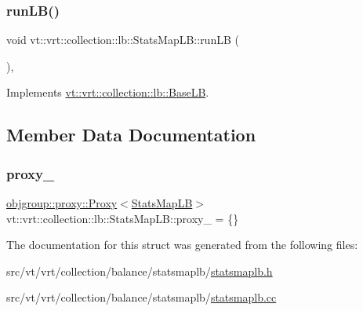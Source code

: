 \mbox{\label{structvt_1_1vrt_1_1collection_1_1lb_1_1_stats_map_l_b_a20a7bd354dcaca4393c66034be3b4083}} 
\subsubsection{\texorpdfstring{run\+L\+B()}{runLB()}}
{\footnotesize\ttfamily void vt\+::vrt\+::collection\+::lb\+::\+Stats\+Map\+L\+B\+::run\+LB (\begin{DoxyParamCaption}{ }\end{DoxyParamCaption})\hspace{0.3cm}{\ttfamily [override]}, {\ttfamily [virtual]}}



Implements \hyperlink{structvt_1_1vrt_1_1collection_1_1lb_1_1_base_l_b_a69a398c54f8129f365171a1189ffcd84}{vt\+::vrt\+::collection\+::lb\+::\+Base\+LB}.



\subsection{Member Data Documentation}
\mbox{\label{structvt_1_1vrt_1_1collection_1_1lb_1_1_stats_map_l_b_a184d157fdde8798ec9ed79a2f4238816}} 
\subsubsection{\texorpdfstring{proxy\+\_\+}{proxy\_}}
{\footnotesize\ttfamily \hyperlink{structvt_1_1objgroup_1_1proxy_1_1_proxy}{objgroup\+::proxy\+::\+Proxy}$<$\hyperlink{structvt_1_1vrt_1_1collection_1_1lb_1_1_stats_map_l_b}{Stats\+Map\+LB}$>$ vt\+::vrt\+::collection\+::lb\+::\+Stats\+Map\+L\+B\+::proxy\+\_\+ = \{\}\hspace{0.3cm}{\ttfamily [private]}}



The documentation for this struct was generated from the following files\+:\begin{DoxyCompactItemize}
\item 
src/vt/vrt/collection/balance/statsmaplb/\hyperlink{statsmaplb_8h}{statsmaplb.\+h}\item 
src/vt/vrt/collection/balance/statsmaplb/\hyperlink{statsmaplb_8cc}{statsmaplb.\+cc}\end{DoxyCompactItemize}
